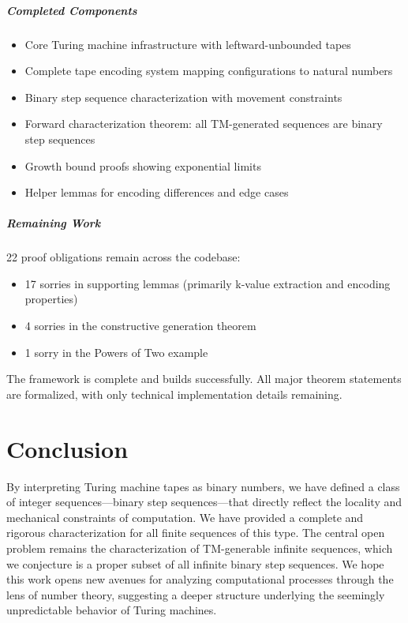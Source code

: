 \paragraph{Completed Components}
\begin{itemize}
\item Core Turing machine infrastructure with leftward-unbounded tapes
\item Complete tape encoding system mapping configurations to natural numbers  
\item Binary step sequence characterization with movement constraints
\item Forward characterization theorem: all TM-generated sequences are binary step sequences
\item Growth bound proofs showing exponential limits
\item Helper lemmas for encoding differences and edge cases
\end{itemize}

\paragraph{Remaining Work}
22 proof obligations remain across the codebase:
\begin{itemize}
\item 17 sorries in supporting lemmas (primarily k-value extraction and encoding properties)
\item 4 sorries in the constructive generation theorem 
\item 1 sorry in the Powers of Two example
\end{itemize}

The framework is complete and builds successfully. All major theorem statements are formalized, with only technical implementation details remaining.

\chapter{Conclusion}

By interpreting Turing machine tapes as binary numbers, we have defined a class of integer sequences---binary step sequences---that directly reflect the locality and mechanical constraints of computation. We have provided a complete and rigorous characterization for all finite sequences of this type. The central open problem remains the characterization of TM-generable infinite sequences, which we conjecture is a proper subset of all infinite binary step sequences. We hope this work opens new avenues for analyzing computational processes through the lens of number theory, suggesting a deeper structure underlying the seemingly unpredictable behavior of Turing machines.

